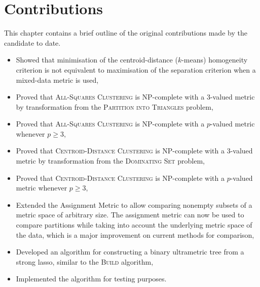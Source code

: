 \chapter{Contributions}
\label{cha:contributions}

This chapter contains a brief outline of the original contributions made by
the candidate to date.
\begin{itemize}
\item Showed that minimisation of the centroid-distance ($k$-means)
  homogeneity criterion is not equivalent to maximisation of the separation
  criterion when a mixed-data metric is used,
\item Proved that \textsc{All-Squares Clustering} is NP-complete with a
  3-valued metric by transformation from the \textsc{Partition into Triangles}
  problem,
\item Proved that \textsc{All-Squares Clustering} is NP-complete with a
  $p$-valued metric whenever $p\geq 3$,
\item Proved that \textsc{Centroid-Distance Clustering} is NP-complete with a
  3-valued metric by transformation from the \textsc{Dominating Set} problem,
\item Proved that \textsc{Centroid-Distance Clustering} is NP-complete with a
  $p$-valued metric whenever $p\geq 3$,
\item Extended the Assignment Metric to allow comparing nonempty subsets of a
  metric space of arbitrary size.  The assignment metric can now be used to
  compare partitions while taking into account the underlying metric space of
  the data, which is a major improvement on current methods for comparison,
\item Developed an algorithm for constructing a binary ultrametric tree from a
  strong lasso, similar to the \textsc{Build} algorithm,
\item Implemented the algorithm for testing purposes.
\end{itemize}

